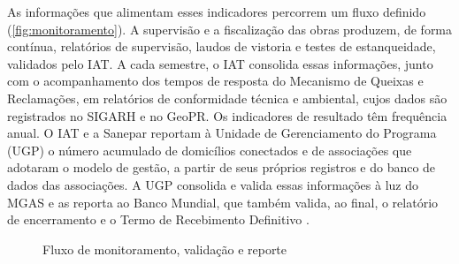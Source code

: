 


As informações que alimentam esses indicadores percorrem um fluxo definido
(\autoref{fig:monitoramento}). A supervisão e a fiscalização das obras
produzem, de forma contínua, relatórios de supervisão, laudos de vistoria e
testes de estanqueidade, validados pelo IAT. A cada semestre, o IAT
consolida essas informações, junto com o acompanhamento dos tempos de
resposta do Mecanismo de Queixas e Reclamações, em relatórios de
conformidade técnica e ambiental, cujos dados são registrados no SIGARH e no
GeoPR. Os indicadores de resultado têm frequência anual. O IAT e a Sanepar
reportam à Unidade de Gerenciamento do Programa (UGP) o número acumulado de
domicílios conectados e de associações que adotaram o modelo de gestão, a
partir de seus próprios registros e do banco de dados das associações. A UGP
consolida e valida essas informações à luz do MGAS e as reporta ao Banco
Mundial, que também valida, ao final, o relatório de encerramento e o Termo de
Recebimento Definitivo \cite{mop2026}.

\begin{figure}[htbp]
  \centering
  \caption{Fluxo de monitoramento, validação e reporte}
  \label{fig:monitoramento}
\end{figure}
